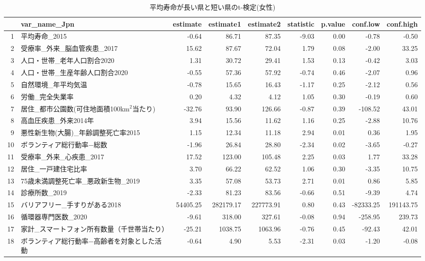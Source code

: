 \begin{table}[ht]
\centering
\caption{平均寿命が長い県と短い県のt-検定(女性)}
\label{LE_Ttest_d_f.tex}
\begingroup\tiny

\begin{adjustbox}{width=.5\textwidth}
\begin{tabular}{rlrrrrrrr}
  \hline
 & var\_name\_Jpn & estimate & estimate1 & estimate2 & statistic & p.value & conf.low & conf.high \\
  \hline
1 & 平均寿命\_2015 & -0.64 & 86.71 & 87.35 & -9.03 & 0.00 & -0.78 & -0.50 \\
  2 & 受療率\_外来\_脳血管疾患\_2017 & 15.62 & 87.67 & 72.04 & 1.79 & 0.08 & -2.00 & 33.25 \\
  3 & 人口・世帯\_老年人口割合2020 & 1.31 & 30.72 & 29.41 & 1.53 & 0.13 & -0.42 & 3.03 \\
  4 & 人口・世帯\_生産年齢人口割合2020 & -0.55 & 57.36 & 57.92 & -0.74 & 0.46 & -2.07 & 0.96 \\
  5 & 自然環境\_年平均気温 & -0.78 & 15.65 & 16.43 & -1.17 & 0.25 & -2.12 & 0.56 \\
  6 & 労働\_完全失業率 & 0.20 & 4.32 & 4.12 & 1.05 & 0.30 & -0.19 & 0.60 \\
  7 & 居住\_都市公園数(可住地面積100km$^2$当たり) & -32.76 & 93.90 & 126.66 & -0.87 & 0.39 & -108.52 & 43.01 \\
  8 & 高血圧疾患\_外来2014年 & 3.94 & 15.56 & 11.62 & 1.16 & 0.25 & -2.88 & 10.76 \\
  9 & 悪性新生物(大腸)\_年齢調整死亡率2015 & 1.15 & 12.34 & 11.18 & 2.94 & 0.01 & 0.36 & 1.95 \\
  10 & ボランティア総行動率−総数 & -1.96 & 26.84 & 28.80 & -2.34 & 0.02 & -3.65 & -0.27 \\
  11 & 受療率\_外来\_心疾患\_2017 & 17.52 & 123.00 & 105.48 & 2.25 & 0.03 & 1.77 & 33.28 \\
  12 & 居住\_一戸建住宅比率 & 3.70 & 66.22 & 62.52 & 1.06 & 0.30 & -3.35 & 10.75 \\
  13 & 75歳未満調整死亡率\_悪政新生物\_2019 & 3.35 & 57.08 & 53.73 & 2.71 & 0.01 & 0.86 & 5.85 \\
  14 & 診療所数\_2019 & -2.33 & 81.23 & 83.56 & -0.66 & 0.51 & -9.39 & 4.74 \\
  15 & バリアフリー\_手すりがある2018 & 54405.25 & 282179.17 & 227773.91 & 0.80 & 0.43 & -82333.25 & 191143.75 \\
  16 & 循環器専門医数\_2020 & -9.61 & 318.00 & 327.61 & -0.08 & 0.94 & -258.95 & 239.73 \\
  17 & 家計\_スマートフォン所有数量（千世帯当たり） & -25.21 & 1038.75 & 1063.96 & -0.76 & 0.45 & -92.43 & 42.01 \\
  18 & ボランティア総行動率−高齢者を対象とした活動 & -0.64 & 4.90 & 5.53 & -2.31 & 0.03 & -1.20 & -0.08 \\
   \hline
\end{tabular}
\end{adjustbox}

\endgroup
\end{table}
